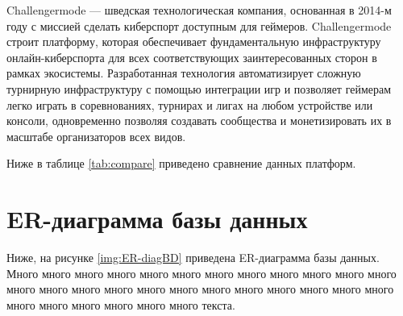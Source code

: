 
Challengermode — шведская технологическая компания, основанная в 2014-м году с миссией сделать киберспорт доступным для геймеров. Challengermode строит платформу, которая обеспечивает фундаментальную инфраструктуру онлайн-киберспорта для всех соответствующих заинтересованных сторон в рамках экосистемы. 
Разработанная технология автоматизирует сложную турнирную инфраструктуру с помощью интеграции игр и позволяет геймерам легко играть в соревнованиях, турнирах и лигах на любом устройстве или консоли, одновременно позволяя создавать сообщества и монетизировать их в масштабе организаторов всех видов.


Ниже в таблице \ref{tab:compare} приведено сравнение данных платформ.

\begin{table}[H]
	\caption{Анализ аналогичных решений}
	\label{tab:compare}
	\centering
\end{table}

\newpage
\section{ER-диаграмма базы данных}
Ниже, на рисунке \ref{img:ER-diagBD} приведена ER-диаграмма базы данных.  Много много много много много много много много много много много много много много много много много много много много много много много много много много много много много много текста.


